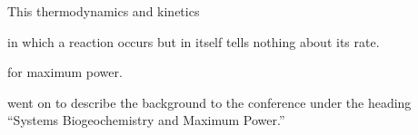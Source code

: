 \documentclass[a4paper,12pt]{article}
\begin{document}
This thermodynamics and kinetics 




in which a reaction occurs but in itself tells nothing about its rate.



 for maximum power.


\citeauthor{odum_emergy_1991} went on to describe the background to the conference under the heading ``Systems Biogeochemistry and Maximum Power.'' 


\citeyear{odum_emergy_1991} 

\newpage




\end{document}
